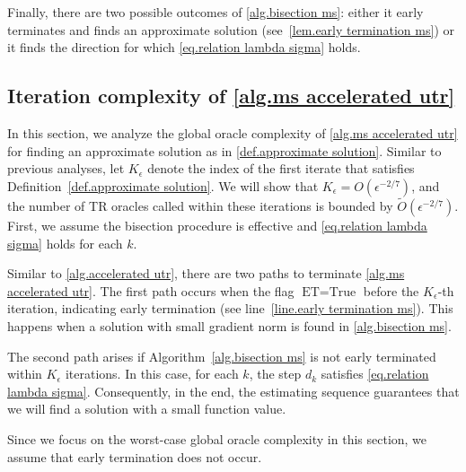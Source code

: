\documentclass{article}
\begin{document}
Finally, there are two possible outcomes of \autoref{alg.bisection ms}: either it early terminates and finds an approximate solution (see~\autoref{lem.early termination ms}) or it finds the direction for which \eqref{eq.relation lambda sigma} holds.

\subsection{Iteration complexity of \autoref{alg.ms accelerated utr}}
In this section, we analyze the global oracle complexity of \autoref{alg.ms accelerated utr} for finding an approximate solution as in \autoref{def.approximate solution}. Similar to previous analyses, let $K_\epsilon$ denote the index of the first iterate that satisfies Definition~\ref{def.approximate solution}. We will show that $K_\epsilon = O(\epsilon^{-2/7})$, and the number of TR oracles called within these iterations is bounded by $\tilde{O}(\epsilon^{-2/7})$. First, we assume the bisection procedure is effective and \eqref{eq.relation lambda sigma} holds for each $k$.

Similar to \autoref{alg.accelerated utr}, there are two paths to terminate \autoref{alg.ms accelerated utr}. The first path occurs when the flag $\textrm{ET} = \text{True}$ before the $K_\epsilon$-th iteration, indicating early termination (see line~\ref{line.early termination ms}). This happens when a solution with small gradient norm is found in \autoref{alg.bisection ms}.

The second path arises if Algorithm~\ref{alg.bisection ms} is not early terminated within $K_\epsilon$ iterations. In this case, for each $k$, the step $d_k$ satisfies \eqref{eq.relation lambda sigma}. Consequently, in the end, the estimating sequence guarantees that we will find a solution with a small function value.

Since we focus on the worst-case global oracle complexity in this section, we assume that early termination does not occur.
\end{document}
